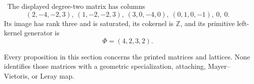 \begin{proposition}
\Verified\ The displayed degree-two matrix has columns
\[
(2,-4,-2,3),\ (1,-2,-2,3),\ (3,0,-4,0),\
(0,1,0,-1),\ 0,\ 0.
\]
Its image has rank three and is saturated, its cokernel is $\mathbb Z$, and its primitive left-kernel generator is
\[
\Phi=(4,2,3,2).
\]
\end{proposition}

Every proposition in this section concerns the printed matrices and lattices. None identifies those matrices with a geometric specialization, attaching, Mayer--Vietoris, or Leray map.
